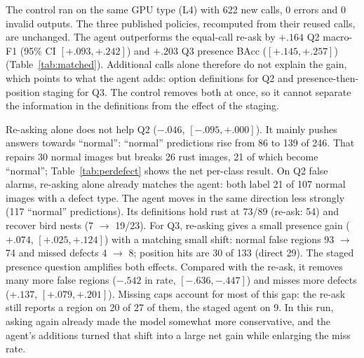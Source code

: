 \documentclass[11pt]{article}
\begin{document}
The control ran on the same GPU type (L4) with 622 new calls, 0 errors and 0 invalid outputs. The three published policies, recomputed from their reused calls, are unchanged. The agent outperforms the equal-call re-ask by $+.164$ Q2 macro-F1 (95\% CI $[+.093,+.242]$) and $+.203$ Q3 presence BAcc ($[+.145,+.257]$) (Table~\ref{tab:matched}). Additional calls alone therefore do not explain the gain, which points to what the agent adds: option definitions for Q2 and presence-then-position staging for Q3. The control removes both at once, so it cannot separate the information in the definitions from the effect of the staging.

Re-asking alone does not help Q2 ($-.046$, $[-.095,+.000]$). It mainly pushes answers towards ``normal'': ``normal'' predictions rise from 86 to 139 of 246. That repairs 30 normal images but breaks 26 rust images, 21 of which become ``normal''; Table~\ref{tab:perdefect} shows the net per-class result. On Q2 false alarms, re-asking alone already matches the agent: both label 21 of 107 normal images with a defect type. The agent moves in the same direction less strongly (117 ``normal'' predictions). Its definitions hold rust at 73/89 (re-ask: 54) and recover bird nests (7 $\rightarrow$ 19/23). For Q3, re-asking gives a small presence gain ($+.074$, $[+.025,+.124]$) with a matching small shift: normal false regions 93 $\rightarrow$ 74 and missed defects 4 $\rightarrow$ 8; position hits are 30 of 133 (direct 29). The staged presence question amplifies both effects. Compared with the re-ask, it removes many more false regions ($-.542$ in rate, $[-.636,-.447]$) and misses more defects ($+.137$, $[+.079,+.201]$). Missing caps account for most of this gap: the re-ask still reports a region on 20 of 27 of them, the staged agent on 9. In this run, asking again already made the model somewhat more conservative, and the agent's additions turned that shift into a large net gain while enlarging the miss rate.
\end{document}

